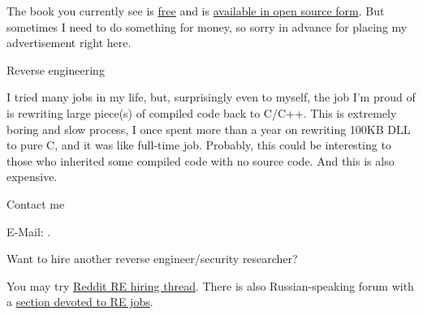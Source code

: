 \vspace*{\fill}

\huge
\normalsize

\bigskip
\bigskip
\bigskip


The book you currently see is \href{http://beginners.re/}{free} and is \href{https://github.com/dennis714/RE-for-beginners/}{available in open source form}.
But sometimes I need to do something for money, so sorry in advance for placing my advertisement right here.

\Large Reverse engineering \normalsize

I tried many jobs in my life, but, surprisingly even to myself, the job I'm proud of is rewriting large piece(s) of compiled code back to C/C++.
This is extremely boring and slow process, I once spent more than a year on rewriting 100KB DLL to pure C, and it was like full-time job.
Probably, this could be interesting to those who inherited some compiled code with no source code.
And this is also expensive.

\large Contact me \normalsize

E-Mail: \GTT{\EMAIL}.

\large Want to hire another reverse engineer/security researcher? \normalsize

You may try \href{https://www.reddit.com/r/ReverseEngineering/comments/5yt1je/rreverseengineerings_2016_triannual_hiring_thread/}{Reddit RE hiring thread}.
There is also Russian-speaking forum with a \href{https://forum.reverse4you.org/forumdisplay.php?f=252}{section devoted to RE jobs}.

\vspace*{\fill}
\vfill
